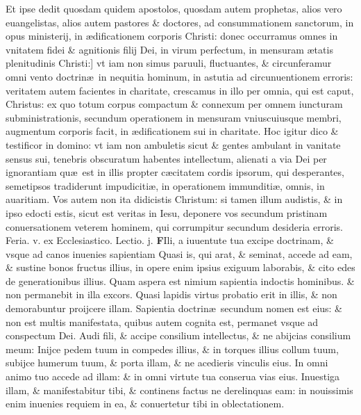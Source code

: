 \documentclass[a5paper,10pt]{book}
\def\leftmarginnote{%
	\lrmarginnote{\hskip -\marginparsep \hskip -6.5em}}
\def\rightmarginnote{%
	\lrmarginnote{\hskip\columnwidth \hskip -1em}}
\def\ae{æ}
\begin{document}
\begin{multicols*}{2}
Et ipse dedit quosdam quidem apostolos, quosdam autem prophetas, alios vero euangelistas, alios autem pastores \& doctores, ad consummationem sanctorum, in opus ministerij, in \ae dificationem corporis Christi: donec occurramus omnes in vnitatem fidei \& agnitionis filij Dei, in virum perfectum, in mensuram \ae tatis plenitudinis\leftmarginnote{\begin{flushright}C\end{flushright}} Christi:] vt iam non simus paruuli, fluctuantes, \& circunferamur omni vento doctrin\ae \ in nequitia hominum, in astutia ad circunuentionem erroris: veritatem autem facientes in charitate, crescamus in illo per omnia, qui est caput, Christus: ex quo totum corpus compactum \& connexum per omnem iuncturam subministrationis, secundum operationem in mensuram vniuscuiusque membri, augmentum corporis facit, in \ae dificationem sui in charitate.
Hoc igitur dico \&
testificor in domino: vt iam non ambuletis sicut \& gentes ambulant in vanitate sensus sui, tenebris obscuratum habentes intellectum, alienati a via Dei per ignorantiam qu\ae \ est in illis propter c\ae citatem cordis ipsorum, qui desperantes, semetipsos tradiderunt impudiciti\ae , in operationem immunditi\ae , omnis, in auaritiam.
Vos autem non ita didicistis Christum: si tamen illum audistis, \& in ipso edocti estis, sicut est veritas in Iesu, deponere vos secundum pristinam conuersationem veterem hominem, qui corrumpitur secundum desideria erroris.
\newline {} \color{red} \hypertarget{THU-SECVNDA-VAGAN}{Feria. v.} ex Ecclesiastico. Lectio. j. \color{black}
\vspace{-2.25em}
\lettrine[lines=2]{\bfseries F}{}Ili,\rightmarginnote{ca. 6.} a iuuentute tua excipe doctrinam, \& vsque ad canos inuenies sapientiam Quasi is, qui arat, \& seminat, accede ad eam, \& sustine bonos fructus illius, in opere enim ipsius exiguum laborabis, \& cito edes de generationibus illius.
Quam aspera est nimium sapientia indoctis hominibus. \& non permanebit in illa excors. Quasi lapidis virtus probatio erit in illis, \& non demorabuntur proijcere illam.
Sapientia doctrin\ae \ secundum nomen est eius: \& non est multis manifestata, quibus autem cognita est, permanet vsque ad conspectum Dei.
Audi fili, \& accipe consilium intellectus, \& ne abijcias consilium meum: Inijce pedem tuum in compedes illius, \& in torques illius collum tuum, subijce humerum tuum, \& porta illam, \& ne acedieris vinculis eius.
In omni animo tuo accede ad illam: \& in omni virtute tua conserua vias eius. Inuestiga illam, \& manifestabitur tibi, \& continens factus ne derelinquas eam: in nouissimis enim inuenies requiem in ea, \& conuertetur tibi in oblectationem.

\end{multicols*}
\end{document}
